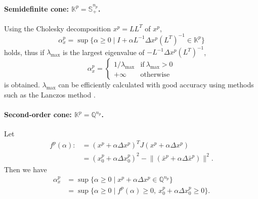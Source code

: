 \paragraph{Semidefinite cone: $\mathbb{K}^p = \mathbb{S}^{n_p}_+$.}
Using the Cholesky decomposition $x^p=LL^T$ of $x^p$,
\[\alpha^p_x = \sup\{\alpha \geq 0 \mid I + \alpha L^{-1} \Delta x^p (L^T)^{-1} \in \mathbb{K}^p\}\]
holds, thus if $\lambda_{\max}$ is the largest eigenvalue of $-L^{-1} \Delta x^p (L^T)^{-1}$,
\[\alpha^p_x = \begin{cases}
    1/\lambda_{\max} & \text{if} ~ \lambda_{\max} > 0 \\
    +\infty & \text{otherwise}
\end{cases}\]
is obtained.
$\lambda_{\max}$ can be efficiently calculated with good accuracy using methods such as the Lanczos method \cite{Golub2013}.

\paragraph{Second-order cone: $\mathbb{K}^p = \mathbb{Q}^{n_p}$.}
Let
\begin{align*}
  f^p(\alpha)
  :&= ( x^p + \alpha \Delta x^p )^T J ( x^p + \alpha \Delta x^p )\\
   &=  ( x^p_0 + \alpha \Delta x^p_0 )^2 - \bigl\|( \bar{x}^p + \alpha \Delta \bar{x}^p )\bigr\|^2.
\end{align*}
Then we have
\begin{align*}
    \alpha_x^p 
    &= \sup\{\alpha \geq 0 \mid x^p + \alpha \Delta x^p \in \mathbb{Q}^{n_p}\}\\
    &= \sup\{\alpha \geq 0 \mid f^p(\alpha) \geq 0, ~x^p_0 + \alpha \Delta x^p_0 \geq 0\}.
\end{align*}

